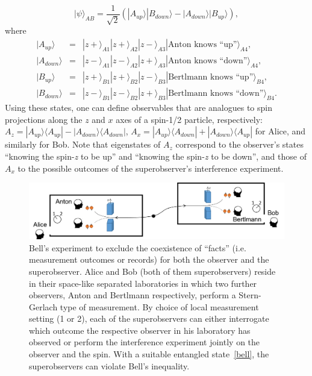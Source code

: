 \documentclass[12pt,a4]{article}
\begin{document}
\begin{equation}
|\psi\rangle_{AB} = \frac{1}{\sqrt{2}} (|A_{up}\rangle|B_{down}\rangle - |A_{down}\rangle |B_{up}\rangle), \label{bell}
\end{equation}
where 
\begin{eqnarray}
|A_{up}\rangle &=& |z+\rangle_{A1} |z+\rangle_{A2}|z-\rangle_{A3}|\mbox{Anton knows ``up''}\rangle_{A4}, \nonumber  \\
|A_{down}\rangle &=&|z-\rangle_{A1}|z-\rangle_{A2}|z+\rangle_{A3} |\mbox{Anton knows ``down''}\rangle_{A4}, \nonumber \\
|B_{up}\rangle &=& |z+\rangle_{B1}|z+\rangle_{B2}|z-\rangle_{B3}|\mbox{Bertlmann knows ``up''}\rangle_{B4}, \nonumber \\
|B_{down}\rangle&=& |z-\rangle_{B1}|z-\rangle_{B2}|z+\rangle_{B3} |\mbox{Bertlmann knows ``down''}\rangle_{B4}. \nonumber
\end{eqnarray}
Using these states, one can define observables that are analogues to spin projections along the $z$ and $x$ axes of a spin-1/2 particle, respectively: $A_z=|A_{up}\rangle \langle A_{up}| - |A_{down} \rangle \langle A_{down}|$, $A_x= |A_{up}\rangle \langle A_{down}| + |A_{down} \rangle \langle A_{up}|$ for Alice, and similarly for Bob. Note that eigenstates of $A_z$ correspond to the observer's states ``knowing the spin-{\it z} to be up'' and ``knowing the spin-{\it z} to be down'', and those of $A_x$ to the possible outcomes of the superobserver's interference experiment.

\begin{figure}
\begin{center}
\includegraphics[width=14.2cm]{Slika3.png}
\end{center}
\caption{Bell's experiment to exclude the coexistence of ``facts'' (i.e. measurement outcomes or records) for both the observer and the superobserver. Alice and Bob (both of them superobservers) reside in their space-like separated laboratories in which two further observers, Anton and Bertlmann respectively, perform a Stern-Gerlach type of measurement. By choice of local measurement setting (1 or 2), each of the superobservers can either interrogate which outcome the respective observer in his laboratory has observed or perform the interference experiment jointly on the observer and the spin. With a suitable entangled state~\ref{bell}, the superobservers can violate Bell's inequality.} \label{figure3}
\end{figure}
\end{document}
